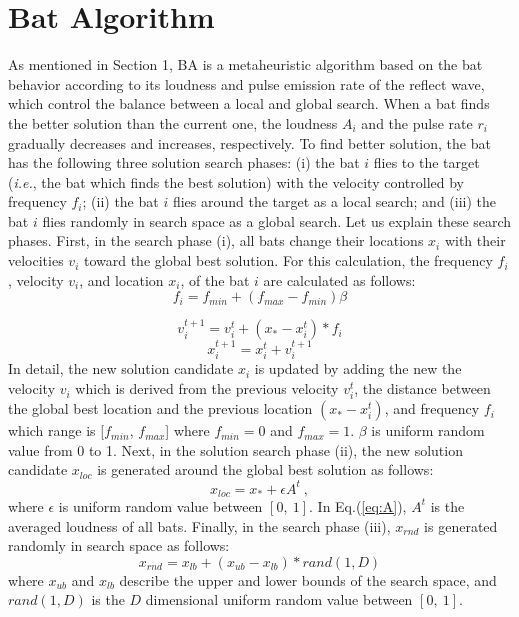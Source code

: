 \documentclass[conference]{IEEEtran}
\begin{document}
\section{Bat Algorithm}
As mentioned in Section 1, BA is a metaheuristic algorithm based on the bat behavior according to its loudness and pulse emission rate of the reflect wave, which control the balance between a local and global search. When a bat finds the better solution than the current one, the loudness $A_i$ and the pulse rate $r_i$ gradually decreases and increases, respectively. To find better solution, the bat has the following three solution search phases: (i) the bat $i$ flies to the target (\textit{i.e.}, the bat which finds the best solution) with the velocity controlled by frequency $f_i$; (ii) the bat $i$ flies around the target as a local search; and (iii) the bat $i$ flies randomly in search space as a global search.
Let us explain these search phases.
First, in the search phase (i), all bats change their locations $x_i$ with their velocities $v_i$ toward the global best solution. For this calculation, the frequency $f_i$, velocity $v_i$, and location $x_i$, of the bat $i$ are calculated as follows:
\begin{equation}
f_{i} =f_{min}+(f_{max}-f_{min}) \beta
\label{eq:freq} 
\end{equation}

\begin{equation}
v_i^{t+1}=v_i^t+(x_*-x_i^t)* f_i
\label{eq:vi}
\end{equation}
\begin{equation}
x_i^{t+1}=x_i^t+v_i^{t+1}
\label{eq:xi}
\end{equation}
In detail, the new solution candidate $x_i$ is updated by adding the new the velocity ${v_i}$ which is derived from the previous velocity $v_i^t$, the distance between the global best location and the previous location $(x_*-x_i^t)$, and frequency $f_i$ which range is [${f_{min}}$, ${f_{max}}$] where ${f_{min}}=0$ and ${f_{max}}=1$. $\beta $ is uniform random value from 0 to 1. Next, in the solution search phase (ii), the new solution candidate $x_{loc}$ is generated around the global best solution as follows:
\begin{equation}
x_{loc}=x_{*}+ \epsilon A^t \ ,
\label{eq:loc}
\end{equation}
where ${\epsilon}$ is uniform random value between ${[0,  \ 1]}$. In Eq.(\ref{eq:A}), ${A^t}$ is the averaged loudness of all bats. Finally, in the search phase (iii), $x_{rnd}$ is generated randomly in search space as follows:
\begin{equation}
\label{eq:xrnd}
x_{rnd}=x_{lb}+(x_{ub}-x_{lb})*rand(1,D)
\end{equation}
where $x_{ub}$ and $x_{lb}$ describe the upper and lower bounds of the search space, and $rand(1,D)$ is the $D$ dimensional uniform random value between $[0, \ 1]$. 
\end{document}
